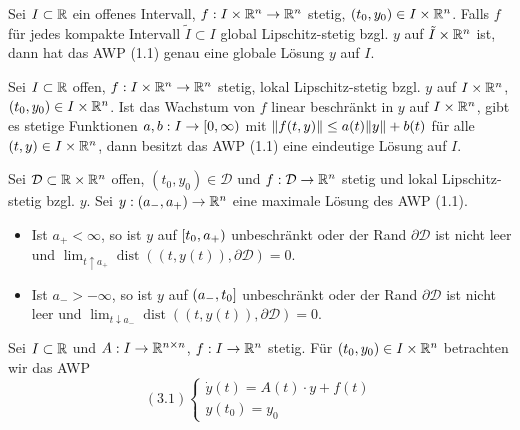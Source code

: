 \documentclass{cheat-sheet}
\newcommand{\D}{\mathcal{D}}
\DeclareMathOperator{\dist}{dist} %
\begin{document}

\begin{satz}
  Sei $I \subset \mathbb{R}$ ein offenes Intervall, $f : I \times \mathbb{R}^n \to \mathbb{R}^n$ stetig, $(t_0, y_0) \in I \times \mathbb{R}^n$. Falls $f$ für jedes kompakte Intervall $\tilde{I} \subset I$ global Lipschitz-stetig bzgl. $y$ auf $\tilde{I} \times \mathbb{R}^n$ ist, dann hat das AWP (1.1) genau eine globale Lösung $y$ auf $I$.
\end{satz}

\begin{satz}
  Sei $I \subset \mathbb{R}$ offen, $f : I \times \mathbb{R}^n \to \mathbb{R}^n$ stetig, lokal Lipschitz-stetig bzgl. $y$ auf $I \times \mathbb{R}^n$, $(t_0, y_0) \in I \times \mathbb{R}^n$. Ist das Wachstum von $f$ linear beschränkt in $y$ auf $I \times \mathbb{R}^n$, \dh{} gibt es stetige Funktionen $a, b : I \to \left[ 0, \infty \right)$ mit $\lVert f(t, y)\rVert \leq a(t) \lVert y\rVert + b(t)$ für alle $(t, y) \in I \times \mathbb{R}^n$, dann besitzt das AWP (1.1) eine eindeutige Lösung auf $I$.
\end{satz}



\begin{satz}
  Sei $\D \subset \R \times \R^n$ offen, $(t_0, y_0) \in \D$ und $f : \D \to \R^n$ stetig und lokal Lipschitz-stetig bzgl. $y$. Sei $y : \left( a_-, a_+ \right) \to \mathbb{R}^n$ eine maximale Lösung des AWP (1.1).
  \begin{itemize}
    \item Ist $a_+ < \infty$, so ist $y$ auf $\left[ t_0, a_+ \right)$ unbeschränkt
    oder der Rand $\partial \D$ ist nicht
    leer und $\lim_{t \uparrow a_+} \dist((t, y(t)), \partial \D) = 0$.
    \item Ist $a_- > -\infty$, so ist $y$ auf $\left( a_-, t_0 \right]$ unbeschränkt oder der Rand $\partial \D$ ist nicht leer und $\lim_{t \downarrow a_-} \dist((t, y(t)), \partial \D) = 0$.
  \end{itemize}
\end{satz}



\begin{prob}
  Sei $I \subset \mathbb{R}$ und $A : I \to \mathbb{R}^{n \times n}$, $f : I \to \mathbb{R}^n$ stetig. Für $(t_0, y_0) \in I \times \mathbb{R}^n$ betrachten wir das AWP
  \[
    (3.1) \left\{ \begin{array}{l}
    \dot{y}(t) = A(t) \cdot y + f(t)\\
    y(t_0) = y_0
    \end{array} \right.
  \]
\end{prob}
\end{document}
